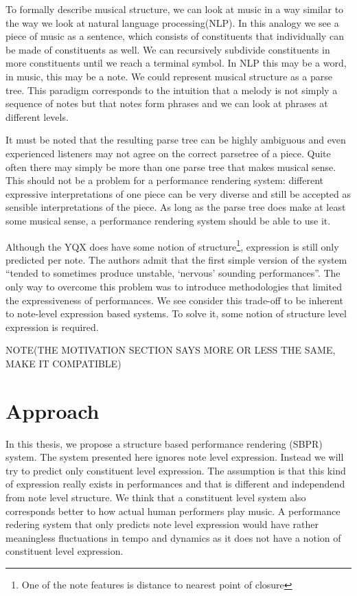 \documentclass[a4paper,10pt]{article}
\begin{document}
To formally describe musical structure, we can look at music in a way similar to the way we look at natural language processing(NLP). In this analogy we see a piece of music as a sentence, which consists of constituents that individually can be made of constituents as well. We can recursively subdivide constituents in more constituents until we reach a terminal symbol. In NLP this may be a word, in music, this may be a note. We could represent musical structure as a parse tree. This paradigm corresponds to the intuition that a melody is not simply a sequence of notes but that notes form phrases and we can look at phrases at different levels. 

It must be noted that the resulting parse tree can be highly ambiguous and even experienced listeners may not agree on the correct parsetree of a piece. Quite often there may simply be more than one parse tree that makes musical sense. This should not be a problem for a performance rendering system: different expressive interpretations of one piece can be very diverse and still be accepted as sensible interpretations of the piece. As long as the parse tree does make at least some musical sense, a performance rendering system should be able to use it.

Although the YQX does have some notion of structure\footnote{One of the note features is distance to nearest point of closure}, expression is still only predicted per note. The authors admit that the first simple version of the system ``tended to sometimes produce unstable, `nervous' sounding performances''. The only way to overcome this problem was to introduce methodologies that limited the expressiveness of performances. We see consider this trade-off to be inherent to note-level expression based systems. To solve it, some notion of structure level expression is required.

NOTE(THE MOTIVATION SECTION SAYS MORE OR LESS THE SAME, MAKE IT COMPATIBLE)

\section{Approach}


In this thesis, we propose a structure based performance rendering (SBPR) system. The system presented here ignores note level expression. Instead we will try to predict only constituent level expression. The assumption is that this kind of expression really exists in performances and that is different and independend from note level structure. We think that a constituent level system also corresponds better to how actual human performers play music. A performance redering system that only predicts note level expression would have rather meaningless fluctuations in tempo and dynamics as it does not have a notion of constituent level expression.
\end{document}
